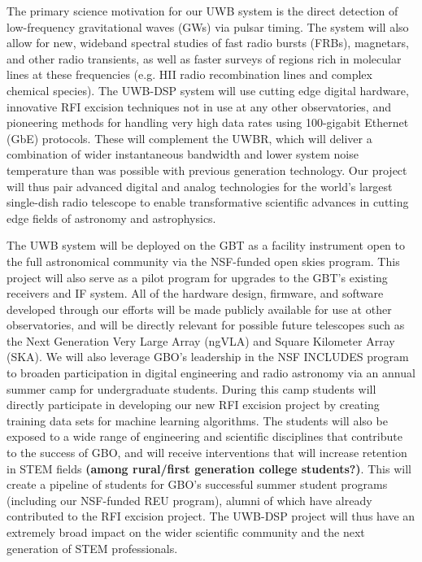 \documentclass[10pt]{myNSF}
\begin{document}
The primary science motivation for our UWB system is the direct
detection of low-frequency gravitational waves (GWs) via pulsar
timing.  The system will also allow for new, wideband spectral studies
of fast radio bursts (FRBs), magnetars, and other radio transients, as
well as faster surveys of regions rich in molecular lines at these
frequencies (e.g. H{\sc II} radio recombination lines and complex
chemical species).  The UWB-DSP system will use cutting edge digital
hardware, innovative RFI excision techniques not in use at any other
observatories, and pioneering methods for handling very high data
rates using 100-gigabit Ethernet (GbE) protocols.  These will
complement the UWBR, which will deliver a combination of wider
instantaneous bandwidth and lower system noise temperature than was
possible with previous generation technology.  Our project will thus
pair advanced digital and analog technologies for the world's largest
single-dish radio telescope to enable transformative scientific
advances in cutting edge fields of astronomy and astrophysics.

The UWB system will be deployed on the GBT as a facility instrument
open to the full astronomical community via the NSF-funded open skies
program.  This project will also serve as a pilot program for upgrades
to the GBT's existing receivers and IF system.  All of the hardware
design, firmware, and software developed through our efforts will be
made publicly available for use at other observatories, and will be
directly relevant for possible future telescopes such as the Next
Generation Very Large Array (ngVLA) and Square Kilometer Array (SKA).
We will also leverage GBO's leadership in the NSF INCLUDES program to
broaden participation in digital engineering and radio astronomy via
an annual summer camp for undergraduate students.  During this camp
students will directly participate in developing our new RFI excision
project by creating training data sets for machine learning
algorithms.  The students will also be exposed to a wide range of
engineering and scientific disciplines that contribute to the success
of GBO, and will receive interventions that will increase retention in
STEM fields \textbf{(among rural/first generation college students?)}.
This will create a pipeline of students for GBO's successful summer
student programs (including our NSF-funded REU program), alumni of
which have already contributed to the RFI excision project.  The
UWB-DSP project will thus have an extremely broad impact on the wider
scientific community and the next generation of STEM professionals.
\end{document}
